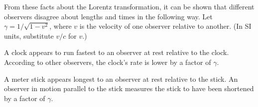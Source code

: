 From these facts about the Lorentz transformation, it can be shown that
different observers disagree about lengths and times in the following
way. Let $\gamma=1/\sqrt{1-v^2}$, where $v$ is the velocity of one
observer relative to another. (In SI units, substitute $v/c$ for $v$.)

A clock appears to run fastest to an observer at rest relative to
the clock. According to other observers, the clock's rate is lower by a factor of $\gamma$.

A meter stick appears longest to an observer at rest relative to     
the stick. An observer in motion parallel to the stick measures
the stick to have been shortened by a factor of $\gamma$.
